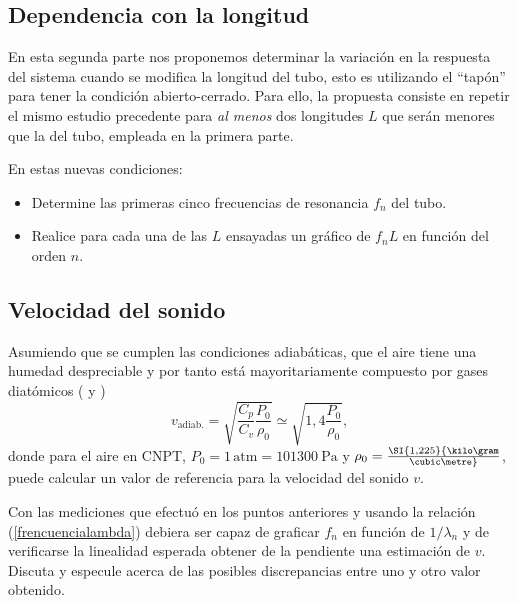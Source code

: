 \documentclass[laboratorio]{guia}
\begin{document}
\subsection{Dependencia con la longitud}
En esta segunda parte nos proponemos determinar la variación en la respuesta del sistema cuando se modifica la longitud del tubo, esto es utilizando el ``tapón'' para tener la condición abierto-cerrado.
Para ello, la propuesta consiste en repetir el mismo estudio precedente para \emph{al menos} dos longitudes \(L\) que serán menores que la del tubo, empleada en la primera parte.

En estas nuevas condiciones:
\begin{itemize}
    \item Determine las primeras cinco frecuencias de resonancia \(f_n\) del tubo.
    \item Realice para cada una de las \(L\) ensayadas un gráfico de \(f_n L\) en función del orden \(n\).
\end{itemize}

\subsection{Velocidad del sonido}
Asumiendo que se cumplen las condiciones adiabáticas, que el aire tiene una humedad despreciable y por tanto está mayoritariamente compuesto por gases diatómicos ( y )
\[
	v_\mathrm{adiab.}= \sqrt{\frac{C_p}{C_v} \frac{P_0}{\rho_0}} \simeq \sqrt{1,4\frac{P_0}{\rho_0}},
\]
donde para el aire en CNPT, \(P_0=1\,\mathrm{atm}= \SI{101300}{\pascal}\) y \(\rho_0 = \SI{1,225}{\kilo\gram\over\cubic\metre}\), puede calcular un valor de referencia para la velocidad del sonido \(v\).

Con las mediciones que efectuó en los puntos anteriores y usando la relación (\ref{frencuencialambda}) debiera ser capaz de graficar \(f_n\) en función de \(1/\lambda_n\) y de verificarse la linealidad esperada obtener de la pendiente una estimación de \(v\).
Discuta y especule acerca de las posibles discrepancias entre uno y otro valor obtenido.
\end{document}
